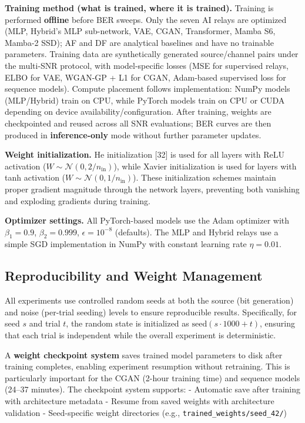 \textbf{Training method (what is trained, where it is trained).} Training is performed \textbf{offline} before BER sweeps. Only the seven AI relays are optimized (MLP, Hybrid's MLP sub-network, VAE, CGAN, Transformer, Mamba S6, Mamba-2 SSD); AF and DF are analytical baselines and have no trainable parameters. Training data are synthetically generated source/channel pairs under the multi-SNR protocol, with model-specific losses (MSE for supervised relays, ELBO for VAE, WGAN-GP + L1 for CGAN, Adam-based supervised loss for sequence models). Compute placement follows implementation: NumPy models (MLP/Hybrid) train on CPU, while PyTorch models train on CPU or CUDA depending on device availability/configuration. After training, weights are checkpointed and reused across all SNR evaluations; BER curves are then produced in \textbf{inference-only} mode without further parameter updates.

\textbf{Weight initialization.} He initialization {[}32{]} is used for all layers with ReLU activation (\(W \sim \mathcal{N}(0, 2/n_{\text{in}})\)), while Xavier initialization is used for layers with tanh activation (\(W \sim \mathcal{N}(0, 1/n_{\text{in}})\)). These initialization schemes maintain proper gradient magnitude through the network layers, preventing both vanishing and exploding gradients during training.

\textbf{Optimizer settings.} All PyTorch-based models use the Adam optimizer with \(\beta_1 = 0.9\), \(\beta_2 = 0.999\), \(\epsilon = 10^{-8}\) (defaults). The MLP and Hybrid relays use a simple SGD implementation in NumPy with constant learning rate \(\eta = 0.01\).

\subsection{Reproducibility and Weight Management}\label{sec:reproducibility-and-weight-management}

All experiments use controlled random seeds at both the source (bit generation) and noise (per-trial seeding) levels to ensure reproducible results. Specifically, for seed \(s\) and trial \(t\), the random state is initialized as \(\text{seed}(s \cdot 1000 + t)\), ensuring that each trial is independent while the overall experiment is deterministic.

A \textbf{weight checkpoint system} saves trained model parameters to disk after training completes, enabling experiment resumption without retraining. This is particularly important for the CGAN (2-hour training time) and sequence models (24--37 minutes). The checkpoint system supports: - Automatic save after training with architecture metadata - Resume from saved weights with architecture validation - Seed-specific weight directories (e.g., \texttt{trained\_weights/seed\_42/})

